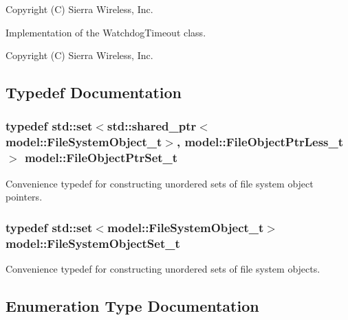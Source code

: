 Copyright (C) Sierra Wireless, Inc.

Implementation of the Watchdog\+Timeout class.

Copyright (C) Sierra Wireless, Inc. 

\subsection{Typedef Documentation}
\subsubsection[{\texorpdfstring{File\+Object\+Ptr\+Set\+\_\+t}{FileObjectPtrSet_t}}]{\setlength{\rightskip}{0pt plus 5cm}typedef std\+::set$<$std\+::shared\+\_\+ptr$<${\bf model\+::\+File\+System\+Object\+\_\+t}$>$, {\bf model\+::\+File\+Object\+Ptr\+Less\+\_\+t}$>$ {\bf model\+::\+File\+Object\+Ptr\+Set\+\_\+t}}\hypertarget{namespacemodel_aa2a6601c8a948122114a53c1aa584a23}{}\label{namespacemodel_aa2a6601c8a948122114a53c1aa584a23}


Convenience typedef for constructing unordered sets of file system object pointers. 

\subsubsection[{\texorpdfstring{File\+System\+Object\+Set\+\_\+t}{FileSystemObjectSet_t}}]{\setlength{\rightskip}{0pt plus 5cm}typedef std\+::set$<${\bf model\+::\+File\+System\+Object\+\_\+t}$>$ {\bf model\+::\+File\+System\+Object\+Set\+\_\+t}}\hypertarget{namespacemodel_aeb77dad74c69ec8bfc42dc205bac3f4b}{}\label{namespacemodel_aeb77dad74c69ec8bfc42dc205bac3f4b}


Convenience typedef for constructing unordered sets of file system objects. 



\subsection{Enumeration Type Documentation}
